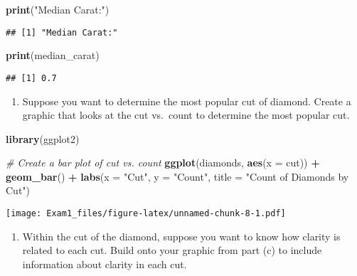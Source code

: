 \documentclass[
]{article}
\newenvironment{Shaded}{\begin{snugshade}}{\end{snugshade}}
\newcommand{\AttributeTok}[1]{\textcolor[rgb]{0.13,0.29,0.53}{#1}}
\newcommand{\CommentTok}[1]{\textcolor[rgb]{0.56,0.35,0.01}{\textit{#1}}}
\newcommand{\FunctionTok}[1]{\textcolor[rgb]{0.13,0.29,0.53}{\textbf{#1}}}
\newcommand{\NormalTok}[1]{#1}
\newcommand{\SpecialCharTok}[1]{\textcolor[rgb]{0.81,0.36,0.00}{\textbf{#1}}}
\newcommand{\StringTok}[1]{\textcolor[rgb]{0.31,0.60,0.02}{#1}}
\providecommand{\tightlist}{%
  \setlength{\itemsep}{0pt}\setlength{\parskip}{0pt}}
\begin{document}
\begin{Shaded}
\begin{Highlighting}[]
\FunctionTok{print}\NormalTok{(}\StringTok{"Median Carat:"}\NormalTok{)}
\end{Highlighting}
\end{Shaded}

\begin{verbatim}
## [1] "Median Carat:"
\end{verbatim}

\begin{Shaded}
\begin{Highlighting}[]
\FunctionTok{print}\NormalTok{(median\_carat)}
\end{Highlighting}
\end{Shaded}

\begin{verbatim}
## [1] 0.7
\end{verbatim}

\begin{enumerate}
\def\labelenumi{\alph{enumi})}
\setcounter{enumi}{2}
\tightlist
\item
  Suppose you want to determine the most popular cut of diamond. Create
  a graphic that looks at the cut vs.~count to determine the most
  popular cut.
\end{enumerate}

\begin{Shaded}
\begin{Highlighting}[]
\FunctionTok{library}\NormalTok{(ggplot2)}

\CommentTok{\# Create a bar plot of cut vs. count}
\FunctionTok{ggplot}\NormalTok{(diamonds, }\FunctionTok{aes}\NormalTok{(}\AttributeTok{x =}\NormalTok{ cut)) }\SpecialCharTok{+}
  \FunctionTok{geom\_bar}\NormalTok{() }\SpecialCharTok{+}
  \FunctionTok{labs}\NormalTok{(}\AttributeTok{x =} \StringTok{"Cut"}\NormalTok{, }\AttributeTok{y =} \StringTok{"Count"}\NormalTok{, }\AttributeTok{title =} \StringTok{"Count of Diamonds by Cut"}\NormalTok{)}
\end{Highlighting}
\end{Shaded}

\texttt{[image: Exam1\_files/figure-latex/unnamed-chunk-8-1.pdf]}

\begin{enumerate}
\def\labelenumi{\alph{enumi})}
\setcounter{enumi}{3}
\tightlist
\item
  Within the cut of the diamond, suppose you want to know how clarity is
  related to each cut. Build onto your graphic from part (c) to include
  information about clarity in each cut.
\end{enumerate}
\end{document}
